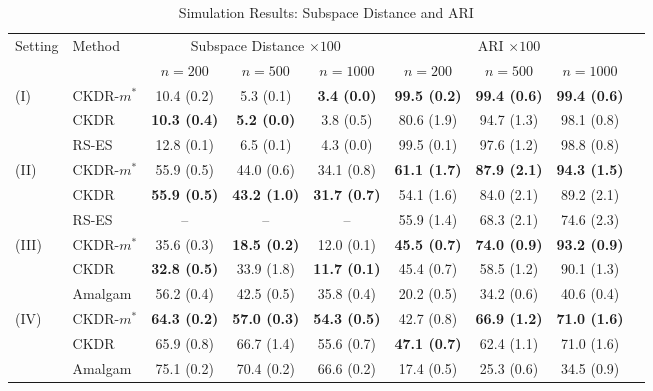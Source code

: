 \begin{table}[htbp]
\centering
\caption{Simulation Results: Subspace Distance and ARI}
\label{tab:simulation_final}
\begin{tabular}{llccccccc}
\toprule
Setting & Method & \multicolumn{3}{c}{Subspace Distance $\times 100$} & \multicolumn{3}{c}{ARI $\times 100$} \\
\cmidrule(lr){3-5} \cmidrule(lr){6-8}
& & $n=200$ & $n=500$ & $n=1000$ & $n=200$ & $n=500$ & $n=1000$ \\
\midrule
\multirow{3}{*}{(I)} & CKDR-$m^*$ & 10.4 (0.2) & 5.3 (0.1) & \textbf{3.4 (0.0)} & \textbf{99.5 (0.2)} & \textbf{99.4 (0.6)} & \textbf{99.4 (0.6)} \\
 & CKDR & \textbf{10.3 (0.4)} & \textbf{5.2 (0.0)} & 3.8 (0.5) & 80.6 (1.9) & 94.7 (1.3) & 98.1 (0.8) \\
 & RS-ES & 12.8 (0.1) & 6.5 (0.1) & 4.3 (0.0) & 99.5 (0.1) & 97.6 (1.2) & 98.8 (0.8) \\
\midrule
\multirow{3}{*}{(II)} & CKDR-$m^*$ & 55.9 (0.5) & 44.0 (0.6) & 34.1 (0.8) & \textbf{61.1 (1.7)} & \textbf{87.9 (2.1)} & \textbf{94.3 (1.5)} \\
 & CKDR & \textbf{55.9 (0.5)} & \textbf{43.2 (1.0)} & \textbf{31.7 (0.7)} & 54.1 (1.6) & 84.0 (2.1) & 89.2 (2.1) \\
 & RS-ES & -- & -- & -- & 55.9 (1.4) & 68.3 (2.1) & 74.6 (2.3) \\
\midrule
\multirow{3}{*}{(III)} & CKDR-$m^*$ & 35.6 (0.3) & \textbf{18.5 (0.2)} & 12.0 (0.1) & \textbf{45.5 (0.7)} & \textbf{74.0 (0.9)} & \textbf{93.2 (0.9)} \\
 & CKDR & \textbf{32.8 (0.5)} & 33.9 (1.8) & \textbf{11.7 (0.1)} & 45.4 (0.7) & 58.5 (1.2) & 90.1 (1.3) \\
 & Amalgam & 56.2 (0.4) & 42.5 (0.5) & 35.8 (0.4) & 20.2 (0.5) & 34.2 (0.6) & 40.6 (0.4) \\
\midrule
\multirow{3}{*}{(IV)} & CKDR-$m^*$ & \textbf{64.3 (0.2)} & \textbf{57.0 (0.3)} & \textbf{54.3 (0.5)} & 42.7 (0.8) & \textbf{66.9 (1.2)} & \textbf{71.0 (1.6)} \\
 & CKDR & 65.9 (0.8) & 66.7 (1.4) & 55.6 (0.7) & \textbf{47.1 (0.7)} & 62.4 (1.1) & 71.0 (1.6) \\
 & Amalgam & 75.1 (0.2) & 70.4 (0.2) & 66.6 (0.2) & 17.4 (0.5) & 25.3 (0.6) & 34.5 (0.9) \\
\bottomrule
\end{tabular}
\end{table}